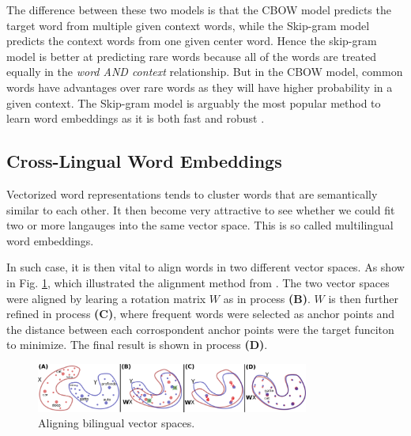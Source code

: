 \documentclass[thesis,fonts=libertine]{cluu}
\begin{document}
The difference between these two models is that the CBOW model predicts the target word from multiple given context words, while the Skip-gram model predicts the context words from one given center word. Hence the skip-gram model is better at predicting rare words because all of the words are treated equally in the \textit{word AND context} relationship. But in the CBOW model, common words have advantages over rare words as they will have higher probability in a given context. The Skip-gram model is arguably the most popular method to learn word embeddings as it is both fast and robust \parencite{levy-etal-2015-improving}.

\subsection{Cross-Lingual Word Embeddings}

Vectorized word representations tends to cluster words that are semantically similar to each other. It then become very attractive to see whether we could fit two or more langauges into the same vector space. This is so called multilingual word embeddings.

In such case, it is then vital to align words in two different vector spaces. As show in Fig. \ref{fig:vec_space_align}, which illustrated the alignment method from \cite{Mikolov:2013ac}. The two vector spaces were aligned by learing a rotation matrix $W$ as in process \textbf{(B)}. $W$ is then further refined in process \textbf{(C)}, where frequent words were selected as anchor points and the distance between each corrospondent anchor points were the target funciton to minimize. The final result is shown in process \textbf{(D)}.

\begin{figure}
  \label{fig:vec_space_align}
  \centering
  \includegraphics[width=0.8\textwidth]{vector_spaces_alignment.png}
  \caption{Aligning bilingual vector spaces. \parencite{Conneau:2017aa}}
\end{figure}
\end{document}
